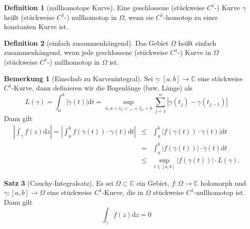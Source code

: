 \documentclass[11pt,titlepage]{article}
\theoremstyle{definition}
\newtheorem{theorem}{Satz}[section]
\newtheorem{definition}[theorem]{Definition}
\newtheorem{remark}{Bemerkung}
\theoremstyle{remark}
\begin{document}
	\begin{definition}[nullhomotope Kurve]
		Eine geschlossene (stückweise $C^1$-) Kurve $\gamma$ heißt (stückweise $C^1$-) nullhomotop 
		in $\Omega$, wenn sie $C^1$-homotop zu einer konstanten Kurve ist.
	\end{definition}
	
	\begin{definition}[einfach zusammenhängend]
		Das Gebiet $\Omega$ heißt einfach zusammenhängend, wenn jede geschlossene (stückweise 
		$C^1$-) Kurve in $\Omega$ (stückweise $C^1$-) nullhomotop in $\Omega$ ist.
	\end{definition}
	
	\begin{remark}[Einschub zu Kurvenintegral]
		Sei $\gamma:[a,b]\to\mathbb{C}$ eine stückweise $C^1$-Kurve, dann definieren wir die 
		Bogenlänge (bzw. Länge) als
		\[ L(\gamma)=\int_a^b |\dot{\gamma}(t)|\mathrm{d}t =\sup_{n,a=t_0 <\ldots <t_n =b} 
		\sum_{j=1}^n |\gamma(t_j)-\gamma(t_{j-1})| \]
		Dann gilt
		\begin{eqnarray*}
			\left|\int_{\gamma} f(z)\mathrm{d}z \right| = \left|\int_a^b f(\gamma(t))\cdot 
			\dot{\gamma}(t)\mathrm{d}t \right| 
			&\leq& \int_a^b |f(\gamma(t))\cdot \dot{\gamma}(t) |\mathrm{d}t \\
			&=& \int_a^b |f(\gamma(t))|\cdot \dot{\gamma}(t)\mathrm{d}t \\
			&\leq& \sup_{t\in [a,b]} |f(\gamma(t))| \cdot L(\gamma).
		\end{eqnarray*}
	\end{remark}
	
	\begin{theorem}[Cauchy-Integralsatz]
		Es sei $\Omega\subset\mathbb{C}$ ein Gebiet, $f:\Omega\to\mathbb{C}$ holomorph und 
		$\gamma:[a,b]\to\Omega$ eine stückweise $C^1$-Kurve, die in $\Omega$ stückweise 
		$C^1$-nullhomotop ist. Dann gilt 
		\[ \int_{\gamma} f(z) \mathrm{d}z =0 \]
	\end{theorem}
	
\end{document}
